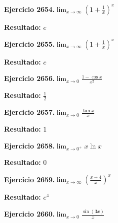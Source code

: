\documentclass[10pt,a4paper]{article}
\begin{document}
\begin{ejbox}
\textbf{Ejercicio 2654.}\quad $\lim_{x\to \infty} \left(1+\frac{1}{x}\right)^x$
\end{ejbox}

\begin{solbox}
\textbf{Resultado:} \(\displaystyle e\)
\end{solbox}

\newpage
\begin{ejbox}
\textbf{Ejercicio 2655.}\quad $\lim_{x\to \infty} \left(1+\frac{1}{x}\right)^x$
\end{ejbox}

\begin{solbox}
\textbf{Resultado:} \(\displaystyle e\)
\end{solbox}

\begin{ejbox}
\textbf{Ejercicio 2656.}\quad $\lim_{x\to 0} \frac{1-\cos x}{x^2}$
\end{ejbox}

\begin{solbox}
\textbf{Resultado:} \(\displaystyle \frac{1}{2}\)
\end{solbox}

\begin{ejbox}
\textbf{Ejercicio 2657.}\quad $\lim_{x\to 0} \frac{\tan x}{x}$
\end{ejbox}

\begin{solbox}
\textbf{Resultado:} \(\displaystyle 1\)
\end{solbox}

\newpage
\begin{ejbox}
\textbf{Ejercicio 2658.}\quad $\lim_{x\to 0^+} x\ln x$
\end{ejbox}

\begin{solbox}
\textbf{Resultado:} \(\displaystyle 0\)
\end{solbox}

\begin{ejbox}
\textbf{Ejercicio 2659.}\quad $\lim_{x\to \infty} \left(\frac{x+4}{x}\right)^{x}$
\end{ejbox}

\begin{solbox}
\textbf{Resultado:} \(\displaystyle e^{4}\)
\end{solbox}

\begin{ejbox}
\textbf{Ejercicio 2660.}\quad $\lim_{x\to 0} \frac{\sin(3x)}{x}$
\end{ejbox}
\end{document}
